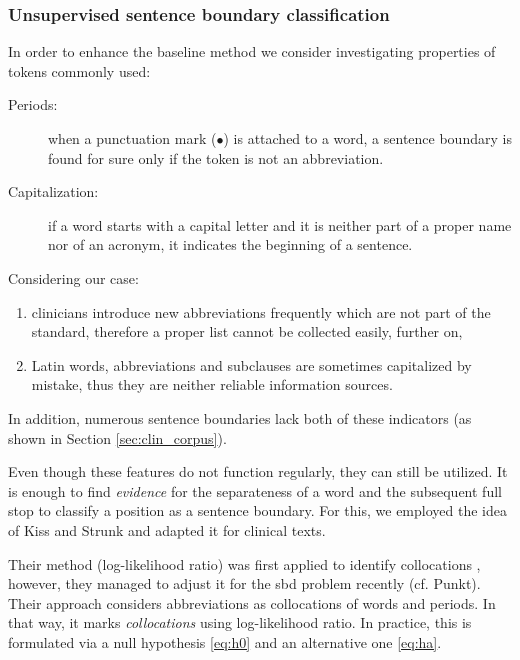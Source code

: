 \subsubsection{Unsupervised sentence boundary classification}

In order to enhance the baseline method we consider investigating properties of tokens commonly used:
\begin{description}
 \item[Periods:] when a punctuation mark ($\bullet$) is attached to a word, a sentence boundary is found for sure only if the token is not an abbreviation.
 \item[Capitalization:] if a word starts with a capital letter and it is neither part of a proper name nor of an acronym, it indicates the beginning of a sentence.
\end{description}
Considering our case:
\begin{enumerate}
\item clinicians introduce new abbreviations frequently which are not part of the standard, therefore a proper list cannot be collected easily, further on, 
\item Latin words, abbreviations and subclauses are sometimes capitalized by mistake, thus they are neither reliable information sources.
\end{enumerate}
In addition, numerous sentence boundaries lack both of these indicators (as shown in Section \ref{sec:clin_corpus}). %

Even though these features do not function regularly, they can still be utilized.  %
It is enough to find \emph{evidence} for the separateness of a word and the subsequent full stop to classify a position as a sentence boundary. 
For this, we employed the idea of Kiss and Strunk \cite{kiss2006unsupervised} and adapted it for clinical texts.

Their method (log-likelihood ratio) was first applied to identify collocations \cite{dunning1993accurate}, however, they managed to adjust it for the \acrshort{sbd} problem recently (cf. Punkt\cite{kiss2006unsupervised}). 
Their approach considers abbreviations as collocations of words and periods. 
In that way, it marks \textit{collocations} using log-likelihood ratio.
In practice, this is formulated via a null hypothesis \eqref{eq:h0} and an alternative one \eqref{eq:ha}. 

